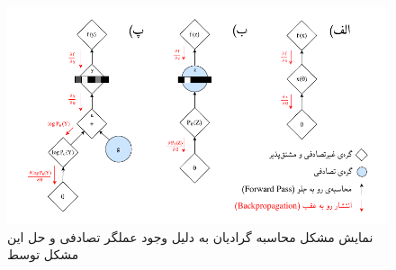 \begin{figure}[!htb]
	\centering
	\includegraphics[width=1.05\textwidth]{images/GumbelSoftmaxReparametrization.pdf} 
	\caption[نمایش مشکل محاسبه گرادیان به دلیل وجود عملگر تصادفی و حل این مشکل توسط 
	]
	{
		نمایش مشکل محاسبه گرادیان به دلیل وجود عملگر تصادفی و حل این مشکل توسط 
		\cite{JanGuPoo17}
		}
	\label{Figure:GumbelSoftmax:reparametrization}
\end{figure}


